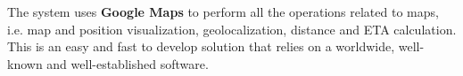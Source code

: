 The system uses \textbf{Google Maps} to perform all the operations related to maps, i.e. map and position visualization, geolocalization, distance and ETA calculation. This is an easy and fast to develop solution that relies on a worldwide, well-known and well-established software.